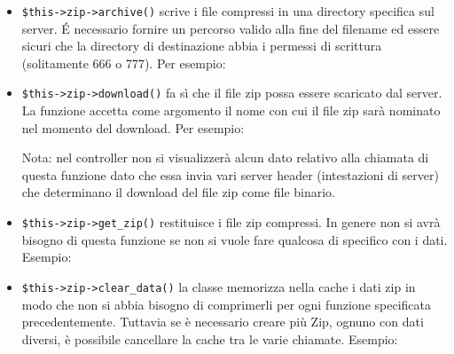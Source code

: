 \begin{itemize}

Questo codice crea un archivio zip con la cartella ``directory'' e tutte le relative sottocartelle. Non sarà però incluso il percorso radice, ovvero 

\item \verb|$this->zip->archive()| scrive i file compressi in una directory specifica sul server. \'E necessario fornire un percorso valido alla fine del filename ed essere sicuri che la directory di destinazione abbia i permessi di scrittura (solitamente 666 o 777). Per esempio:


\item \verb|$this->zip->download()| fa sì che il file zip possa essere scaricato dal server. La funzione accetta come argomento il nome con cui il file zip sarà nominato nel momento del download. Per esempio:


Nota: nel controller non si visualizzerà alcun dato relativo alla chiamata di questa funzione dato che essa invia vari server header (intestazioni di server) che determinano il download del file zip come file binario.

\item \verb|$this->zip->get_zip()| restituisce i file zip compressi. In genere non si avrà bisogno di questa funzione se non si vuole fare qualcosa di specifico con i dati. Esempio:


\item \verb|$this->zip->clear_data()| la classe memorizza nella cache i dati zip in modo che non si abbia bisogno di comprimerli per ogni funzione specificata precedentemente. Tuttavia se è necessario creare più Zip, ognuno con dati diversi, è possibile cancellare la cache tra le varie chiamate. Esempio:


\end{itemize}
